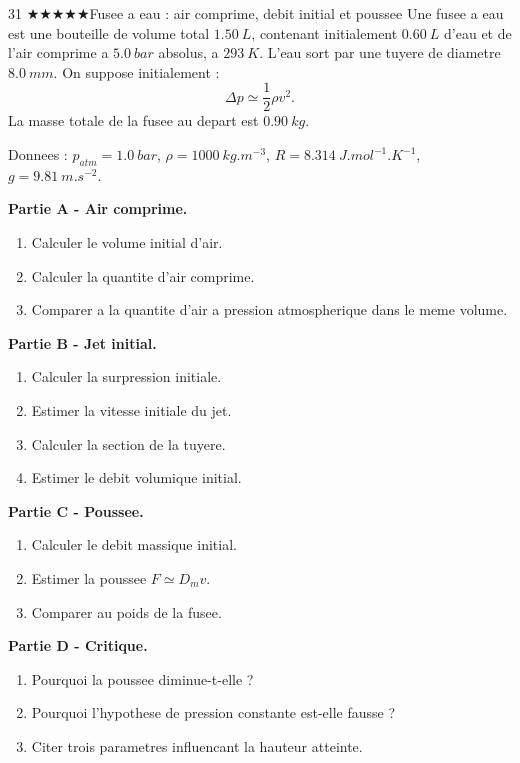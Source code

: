 \documentclass[11pt,a4paper]{article}
\newcommand{\difffive}{\(\bigstar\bigstar\bigstar\bigstar\bigstar\)}
\begin{document}
\begin{probleme}{31 \difffive}{Fusee a eau : air comprime, debit initial et poussee}
Une fusee a eau est une bouteille de volume total \(\SI{1.50}{L}\), contenant initialement \(\SI{0.60}{L}\) d'eau et de l'air comprime a \(\SI{5.0}{bar}\) absolus, a \(\SI{293}{K}\). L'eau sort par une tuyere de diametre \(\SI{8.0}{mm}\). On suppose initialement :
\[
\Delta p \simeq \frac12\rho v^2.
\]
La masse totale de la fusee au depart est \(\SI{0.90}{kg}\).

Donnees : \(p_{atm}=\SI{1.0}{bar}\), \(\rho=\SI{1000}{kg.m^{-3}}\), \(R=\SI{8.314}{J.mol^{-1}.K^{-1}}\), \(g=\SI{9.81}{m.s^{-2}}\).

\textbf{Partie A - Air comprime.}
\begin{enumerate}
\item Calculer le volume initial d'air.
\item Calculer la quantite d'air comprime.
\item Comparer a la quantite d'air a pression atmospherique dans le meme volume.
\end{enumerate}

\textbf{Partie B - Jet initial.}
\begin{enumerate}[resume]
\item Calculer la surpression initiale.
\item Estimer la vitesse initiale du jet.
\item Calculer la section de la tuyere.
\item Estimer le debit volumique initial.
\end{enumerate}

\textbf{Partie C - Poussee.}
\begin{enumerate}[resume]
\item Calculer le debit massique initial.
\item Estimer la poussee \(F\simeq D_m v\).
\item Comparer au poids de la fusee.
\end{enumerate}

\textbf{Partie D - Critique.}
\begin{enumerate}[resume]
\item Pourquoi la poussee diminue-t-elle ?
\item Pourquoi l'hypothese de pression constante est-elle fausse ?
\item Citer trois parametres influencant la hauteur atteinte.
\end{enumerate}
\end{probleme}
\end{document}
